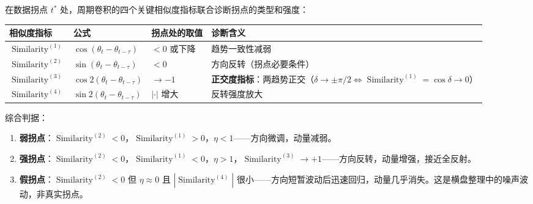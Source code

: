 \begin{proposition}[拐点处的周期卷积诊断]\label{prop:inflection_periodic_transform}
在数据拐点 $t^*$ 处，周期卷积的四个关键相似度指标联合诊断拐点的类型和强度：
\begin{center}
\begin{tabular}{>{\centering\arraybackslash}p{2.7cm}>{\centering\arraybackslash}p{3.2cm}>{\centering\arraybackslash}p{3.0cm}>{\centering\arraybackslash}p{4.6cm}}
\toprule
相似度指标 & 公式 & 拐点处的取值 & 诊断含义 \\
\midrule
$\operatorname{Similarity}^{(1)}$ & $\cos(\theta_t - \theta_{t-\tau})$ & $< 0$ 或下降 & 趋势一致性减弱 \\
$\operatorname{Similarity}^{(2)}$ & $\sin(\theta_t - \theta_{t-\tau})$ & $< 0$ & 方向反转（拐点必要条件） \\
$\operatorname{Similarity}^{(3)}$ & $\cos 2(\theta_t - \theta_{t-\tau})$ & $\to -1$ & \textbf{正交度指标}：两趋势正交（$\delta\to\pm\pi/2\iff\operatorname{Similarity}^{(1)}=\cos\delta\to0$） \\
$\operatorname{Similarity}^{(4)}$ & $\sin 2(\theta_t - \theta_{t-\tau})$ & $|\cdot|$ 增大 & 反转强度放大 \\
\bottomrule
\end{tabular}
\end{center}
综合判据：
\begin{enumerate}[label=(\roman*)]
    \item \textbf{弱拐点}：$\operatorname{Similarity}^{(2)} < 0$，$\operatorname{Similarity}^{(1)} > 0$，$\eta < 1$——方向微调，动量减弱。
    \item \textbf{强拐点}：$\operatorname{Similarity}^{(2)} < 0$，$\operatorname{Similarity}^{(1)} < 0$，$\eta > 1$，$\operatorname{Similarity}^{(3)} \to +1$——方向反转，动量增强，接近全反射。
    \item \textbf{假拐点}：$\operatorname{Similarity}^{(2)} < 0$ 但 $\eta \approx 0$ 且 $|\operatorname{Similarity}^{(4)}|$ 很小——方向短暂波动后迅速回归，动量几乎消失。这是横盘整理中的噪声波动，非真实拐点。
\end{enumerate}
\end{proposition}

